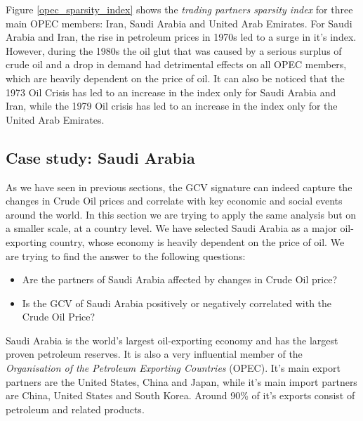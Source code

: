 Figure \ref{opec_sparsity_index} shows the \emph{trading partners sparsity index} for three main OPEC members: Iran, Saudi Arabia and United Arab Emirates. For Saudi Arabia and Iran, the rise in petroleum prices in 1970s led to a surge in it's index. However, during the 1980s the oil glut that was caused by a serious surplus of crude oil and a drop in demand had detrimental effects on all OPEC members, which are heavily dependent on the price of oil. It can also be noticed that the 1973 Oil Crisis has led to an increase in the index only for Saudi Arabia and Iran, while the 1979 Oil crisis has led to an increase in the index only for the United Arab Emirates.

\subsection{Case study: Saudi Arabia}
\label{case_study_saudi}



As we have seen in previous sections, the GCV signature can indeed capture the changes in Crude Oil prices and correlate with key economic and social events around the world. In this section we are trying to apply the same analysis but on a smaller scale, at a country level. We have selected Saudi Arabia as a major oil-exporting country, whose economy is heavily dependent on the price of oil. We are trying to find the answer to the following questions:
\begin{itemize}
 \item Are the partners of Saudi Arabia affected by changes in Crude Oil price?
 \item Is the GCV of Saudi Arabia positively or negatively correlated with the Crude Oil Price?
\end{itemize}

Saudi Arabia is the world's largest oil-exporting economy and has the largest proven petroleum reserves. It is also a very influential member of the \emph{Organisation of the Petroleum Exporting Countries} (OPEC). It's main export partners are the United States, China and Japan, while it's main import partners are China, United States and South Korea. Around 90\% of it's exports consist of petroleum and related products. 

